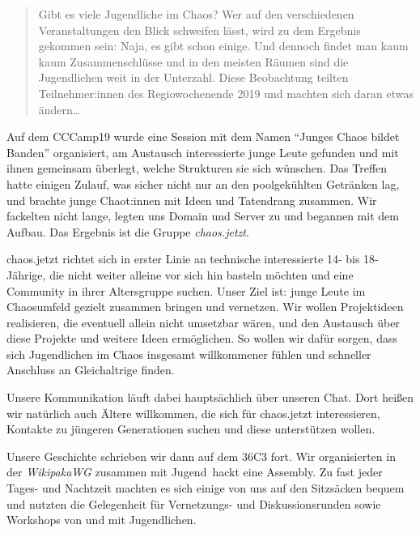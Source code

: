 \begin{DSarticle}[
    title={chaos.jetzt},
    author=ruru4143, email=ruru-chaosjetzt-dsartikel@r3.at,
    head=chaos.jetzt,
    tocentry=chaos.jetzt,
]

\begin{abstract}
Gibt es viele Jugendliche im Chaos?
Wer auf den verschiedenen Veranstaltungen den Blick schweifen lässt, wird zu dem Ergebnis gekommen sein:
Naja, es gibt schon einige.
Und dennoch findet man kaum kaum Zusammenschlüsse und in den meisten Räumen sind die Jugendlichen weit in der Unterzahl.
Diese Beobachtung teilten Teilnehmer:innen des Regiowochenende 2019 und machten sich daran etwas ändern\ldots
\end{abstract}


Auf dem CCCamp19 wurde eine Session mit dem Namen \enquote{Junges Chaos bildet Banden} organisiert, am Austausch interessierte junge Leute gefunden und mit ihnen gemeinsam überlegt, welche Strukturen sie sich wünschen.
Das Treffen hatte einigen Zulauf, was sicher nicht nur an den poolgekühlten Getränken lag, und brachte junge Chaot:innen mit Ideen und Tatendrang zusammen.
Wir fackelten nicht lange, legten uns Domain und Server zu und begannen mit dem Aufbau. Das Ergebnis ist die Gruppe \emph{chaos.jetzt}.

chaos.jetzt richtet sich in erster Linie an technische interessierte 14- bis 18-Jährige, die nicht weiter alleine vor sich hin basteln möchten und eine Community in ihrer Altersgruppe suchen.
Unser Ziel ist: junge Leute im Chaosumfeld gezielt zusammen bringen und vernetzen.
Wir wollen Projektideen realisieren, die eventuell allein nicht umsetzbar wären, und den Austausch über diese Projekte und weitere Ideen ermöglichen.
So wollen wir dafür sorgen, dass sich Jugendlichen im Chaos insgesamt willkommener fühlen und schneller Anschluss an Gleichaltrige finden.

Unsere Kommunikation läuft dabei hauptsächlich über unseren Chat.
Dort heißen wir natürlich auch Ältere willkommen, die sich für chaos.jetzt interessieren, Kontakte zu jüngeren Generationen suchen und diese unterstützen wollen.

Unsere Geschichte schrieben wir dann auf dem 36C3 fort. Wir organisierten in der \emph{WikipakaWG} zusammen mit Jugend~hackt eine Assembly.
Zu fast jeder Tages- und Nachtzeit machten es sich einige von uns auf den Sitzsäcken bequem und nutzten die Gelegenheit für Vernetzungs- und Diskussionsrunden sowie Workshops von und mit Jugendlichen.


\end{DSarticle}

